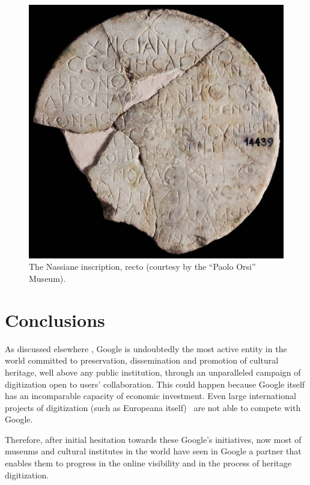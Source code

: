 \documentclass[amsthm,ebook]{saparticle}
\begin{document}
\begin{figure}[!bp]
\centering
 \includegraphics[width=\columnwidth]{EAGLE2016BONACINIPilotprojectatPaoloOrsiMuseum-img006.jpg}
\caption{ The Nassiane inscription, recto (courtesy by the ``Paolo Orsi'' Museum). }
\label{fig:6}
\end{figure}

\section{Conclusions}


\noindent As discussed elsewhere \citep{Bonacini2013, Bonacini2014}, Google is undoubtedly the most active entity in the world committed to
preservation, dissemination and promotion of cultural heritage, well above any public institution, through an
unparalleled campaign of digitization open to users’ collaboration. This could happen because Google itself has an
incomparable capacity of economic investment. Even large international projects of digitization (such as Europeana
itself) \ are not able to compete with Google.

Therefore, after initial hesitation towards these Google’s initiatives, now most of museums and cultural institutes in
the world have seen in Google a partner that enables them to progress in the online visibility and in the process of
heritage digitization.
\end{document}

